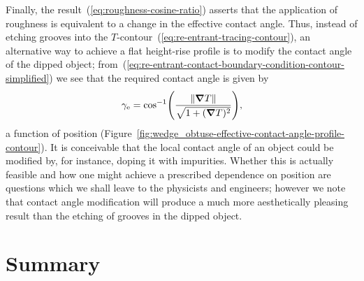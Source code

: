 \begin{figure}
\end{figure}

Finally, the result~(\ref{eq:roughness-cosine-ratio})
asserts that the application of roughness
is equivalent to a change in the effective contact angle.
Thus, instead of etching grooves
into the $T$-contour~(\ref{eq:re-entrant-tracing-contour}),
an alternative way to achieve a flat height-rise profile
is to modify the contact angle of the dipped object;
from~(\ref{eq:re-entrant-contact-boundary-condition-contour-simplified})
we see that the required contact angle is given by
\begin{equation}
  \gamma_\eff =
    \cos^{-1} \roundbr*{\frac{\norm{\del T}}{\sqrt{1 + (\del T)^2}}},
  \label{eq:effective-contact-angle-required}
\end{equation}
a function of position
(Figure~\ref{fig:wedge_obtuse-effective-contact-angle-profile-contour}).
It is conceivable that
the local contact angle of an object could be modified
by, for instance, doping it with impurities.
Whether this is actually feasible
and how one might achieve a prescribed dependence on position
are questions which we shall leave to the physicists and engineers;
however we note that contact angle modification
will produce a much more aesthetically pleasing result
than the etching of grooves in the dipped object.

\begin{figure}
\end{figure}

\section{Summary}
\label{sec:re-entrant.summary}

